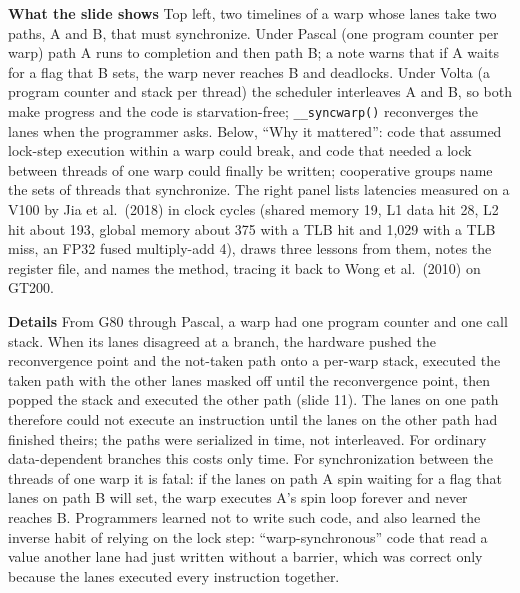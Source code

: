 \documentclass[11pt,letterpaper]{article}
\newcommand{\para}[1]{\medskip\noindent\textbf{#1}\quad}
\begin{document}
\para{What the slide shows} Top left, two timelines of a warp whose lanes take two paths, A and B, that must synchronize. Under Pascal (one program counter per warp) path A runs to completion and then path B; a note warns that if A waits for a flag that B sets, the warp never reaches B and deadlocks. Under Volta (a program counter and stack per thread) the scheduler interleaves A and B, so both make progress and the code is starvation-free; \texttt{\_\_syncwarp()} reconverges the lanes when the programmer asks. Below, ``Why it mattered'': code that assumed lock-step execution within a warp could break, and code that needed a lock between threads of one warp could finally be written; cooperative groups name the sets of threads that synchronize. The right panel lists latencies measured on a V100 by Jia et al.\ (2018) in clock cycles (shared memory 19, L1 data hit 28, L2 hit about 193, global memory about 375 with a TLB hit and 1,029 with a TLB miss, an FP32 fused multiply-add 4), draws three lessons from them, notes the register file, and names the method, tracing it back to Wong et al.\ (2010) on GT200.

\para{Details} From G80 through Pascal, a warp had one program counter and one call stack. When its lanes disagreed at a branch, the hardware pushed the reconvergence point and the not-taken path onto a per-warp stack, executed the taken path with the other lanes masked off until the reconvergence point, then popped the stack and executed the other path (slide 11). The lanes on one path therefore could not execute an instruction until the lanes on the other path had finished theirs; the paths were serialized in time, not interleaved. For ordinary data-dependent branches this costs only time. For synchronization between the threads of one warp it is fatal: if the lanes on path A spin waiting for a flag that lanes on path B will set, the warp executes A's spin loop forever and never reaches B. Programmers learned not to write such code, and also learned the inverse habit of relying on the lock step: ``warp-synchronous'' code that read a value another lane had just written without a barrier, which was correct only because the lanes executed every instruction together.
\end{document}
